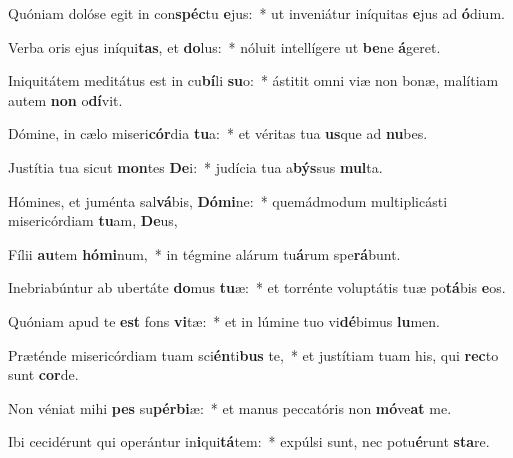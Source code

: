 \item Quóniam dolóse egit in con\textbf{spéc}tu \textbf{e}jus:~* ut inveniátur iníquitas \textbf{e}jus ad \textbf{ó}dium.
\item Verba oris ejus iníqui\textbf{tas}, et \textbf{do}lus:~* nóluit intellígere ut \textbf{be}ne \textbf{á}geret.
\item Iniquitátem meditátus est in cu\textbf{bí}li \textbf{su}o:~* ástitit omni viæ non bonæ, malítiam autem \textbf{non} o\textbf{dí}vit.
\item Dómine, in cælo miseri\textbf{cór}dia \textbf{tu}a:~* et véritas tua \textbf{us}que ad \textbf{nu}bes.
\item Justítia tua sicut \textbf{mon}tes \textbf{De}i:~* judícia tua a\textbf{býs}sus \textbf{mul}ta.
\item Hómines, et juménta sal\textbf{vá}bis, \textbf{Dó}\textbf{mi}ne:~* quemádmodum multiplicásti misericórdiam \textbf{tu}am, \textbf{De}us,
\item Fílii \textbf{au}tem \textbf{hó}\textbf{mi}num,~* in tégmine alárum tu\textbf{á}rum spe\textbf{rá}bunt.
\item Inebriabúntur ab ubertáte \textbf{do}mus \textbf{tu}æ:~* et torrénte voluptátis tuæ po\textbf{tá}bis \textbf{e}os.
\item Quóniam apud te \textbf{est} fons \textbf{vi}tæ:~* et in lúmine tuo vi\textbf{dé}bimus \textbf{lu}men.
\item Præténde misericórdiam tuam sci\textbf{én}ti\textbf{bus} te,~* et justítiam tuam his, qui \textbf{rec}to sunt \textbf{cor}de.
\item Non véniat mihi \textbf{pes} su\textbf{pér}\textbf{bi}æ:~* et manus peccatóris non \textbf{mó}ve\textbf{at} me.
\item Ibi cecidérunt qui operántur in\textbf{i}qui\textbf{tá}tem:~* expúlsi sunt, nec potu\textbf{é}runt \textbf{sta}re.
